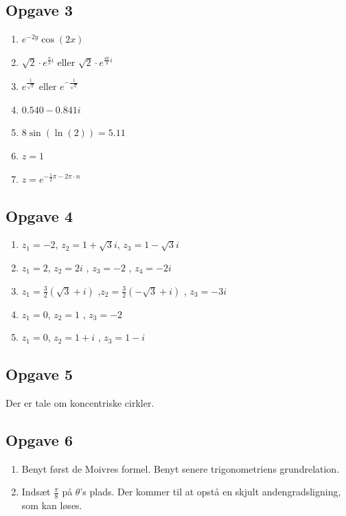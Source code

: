 \documentclass[a4paper, 12pt,titlepage]{article}
\begin{document}
\subsection*{Opgave 3}
\label{sec:org09c1647}
\begin{enumerate}
\item \(e^{-2y} \cos(2x)\)
\item \(\sqrt{2}\cdot e^{\frac{\pi}{3} i}\) eller \(\sqrt{2}\cdot e^{\frac{4 \pi}{3} i}\)
\item \(e^{\frac{1}{\sqrt{2}}}\) eller \(e^{-\frac{1}{\sqrt{2}}}\)
\item \(0.540 - 0.841 i\)
\item \(8 \sin\left(\ln(2)\right) =5.11\)
\item \(z=1\)
\item \(z=e^{-\frac{1}{2} \pi - 2 \pi \cdot n}\)
\end{enumerate}

\subsection*{Opgave 4}
\label{sec:orga51ca8f}
\begin{enumerate}
\item \(z_1=-2\), \(z_2=1+\sqrt{3} i\), \(z_3 = 1- \sqrt{3}i\)
\item \(z_1=2\), \(z_2= 2i\) , \(z_3 = -2\) , \(z_4 =-2i\)
\item \(z_1=\frac{3}{2} \left(\sqrt{3} + i\right)\) ,\(z_2=\frac{3}{2} \left(-\sqrt{3} + i\right)\) , \(z_3 = -3i\)
\item \(z_1=0\), \(z_2=1\) , \(z_3=-2\)
\item \(z_1=0\), \(z_2 =1+i\) , \(z_3=1-i\)
\end{enumerate}

\subsection*{Opgave 5}
\label{sec:orga1e5de1}
Der er tale om koncentriske cirkler.

\subsection*{Opgave 6}
\label{sec:org7ec5883}
\begin{enumerate}
\item Benyt først de Moivres formel. Benyt senere trigonometriens grundrelation.
\item Indsæt \(\frac{\pi}{8}\) på \(\theta\)'s plads. Der kommer til at opstå en skjult andengradsligning, som kan løses.
\end{enumerate}
\end{document}
